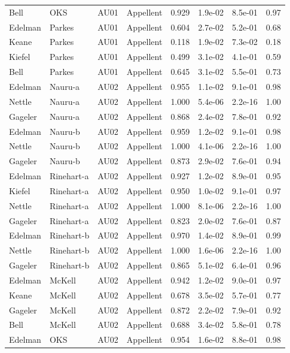 \documentclass{monashthesis}
\begin{document}
\begin{center}
\begin{longtable}{llllllll}
Bell & OKS & AU01 & Appellent & 0.929 & 1.9e-02 & 8.5e-01 & 0.97 \\
Edelman & Parkes & AU01 & Appellent & 0.604 & 2.7e-02 & 5.2e-01 & 0.68 \\
Keane & Parkes & AU01 & Appellent & 0.118 & 1.9e-02 & 7.3e-02 & 0.18 \\
Kiefel & Parkes & AU01 & Appellent & 0.499 & 3.1e-02 & 4.1e-01 & 0.59 \\
Bell & Parkes & AU01 & Appellent & 0.645 & 3.1e-02 & 5.5e-01 & 0.73 \\
Edelman & Nauru-a & AU02 & Appellent & 0.955 & 1.1e-02 & 9.1e-01 & 0.98 \\
Nettle & Nauru-a & AU02 & Appellent & 1.000 & 5.4e-06 & 2.2e-16 & 1.00 \\
Gageler & Nauru-a & AU02 & Appellent & 0.868 & 2.4e-02 & 7.8e-01 & 0.92 \\
Edelman & Nauru-b & AU02 & Appellent & 0.959 & 1.2e-02 & 9.1e-01 & 0.98 \\
Nettle & Nauru-b & AU02 & Appellent & 1.000 & 4.1e-06 & 2.2e-16 & 1.00 \\
Gageler & Nauru-b & AU02 & Appellent & 0.873 & 2.9e-02 & 7.6e-01 & 0.94 \\
Edelman & Rinehart-a & AU02 & Appellent & 0.927 & 1.2e-02 & 8.9e-01 & 0.95 \\
Kiefel & Rinehart-a & AU02 & Appellent & 0.950 & 1.0e-02 & 9.1e-01 & 0.97 \\
Nettle & Rinehart-a & AU02 & Appellent & 1.000 & 8.1e-06 & 2.2e-16 & 1.00 \\
Gageler & Rinehart-a & AU02 & Appellent & 0.823 & 2.0e-02 & 7.6e-01 & 0.87 \\
Edelman & Rinehart-b & AU02 & Appellent & 0.970 & 1.4e-02 & 8.9e-01 & 0.99 \\
Nettle & Rinehart-b & AU02 & Appellent & 1.000 & 1.6e-06 & 2.2e-16 & 1.00 \\
Gageler & Rinehart-b & AU02 & Appellent & 0.865 & 5.1e-02 & 6.4e-01 & 0.96 \\
Edelman & McKell & AU02 & Appellent & 0.942 & 1.2e-02 & 9.0e-01 & 0.97 \\
Keane & McKell & AU02 & Appellent & 0.678 & 3.5e-02 & 5.7e-01 & 0.77 \\
Gageler & McKell & AU02 & Appellent & 0.872 & 2.2e-02 & 7.9e-01 & 0.92 \\
Bell & McKell & AU02 & Appellent & 0.688 & 3.4e-02 & 5.8e-01 & 0.78 \\
Edelman & OKS & AU02 & Appellent & 0.954 & 1.6e-02 & 8.8e-01 & 0.98 \\

\end{longtable}
\end{center}
\end{document}
